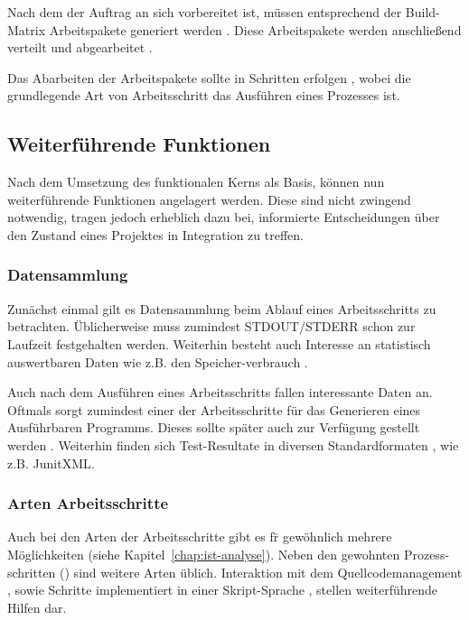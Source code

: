 Nach dem der Auftrag an sich vorbereitet ist, müssen entsprechend der Build-Matrix 
Arbeitspakete generiert werden .
Diese Arbeitspakete werden anschließend verteilt  und abgearbeitet .

Das Abarbeiten der Arbeitspakete sollte in Schritten erfolgen ,
wobei die grundlegende Art von Arbeitsschritt das Ausführen eines Prozesses  ist.


\subsection{Weiterführende Funktionen}

Nach dem Umsetzung des funktionalen Kerns als Basis,
k\"onnen nun weiterf\"uhrende Funktionen angelagert werden.
Diese sind nicht zwingend notwendig, tragen jedoch erheblich dazu bei,
informierte Entscheidungen \"uber den Zustand eines Projektes in Integration zu treffen.

\subsubsection{Datensammlung}

Zun\"achst einmal gilt es Datensammlung beim Ablauf eines Arbeitsschritts zu betrachten.
\"Ublicherweise muss zumindest STDOUT/STDERR schon zur Laufzeit festgehalten  werden.
Weiterhin besteht auch Interesse an statistisch auswertbaren Daten
wie z.B. den Speicher-verbrauch .

Auch nach dem Ausf\"uhren eines Arbeitsschritts fallen interessante Daten an.
Oftmals sorgt zumindest einer der Arbeitsschritte für das Generieren eines Ausführbaren Programms.
Dieses sollte sp\"ater auch zur Verf\"ugung gestellt werden .
Weiterhin finden sich Test-Resultate in diversen Standardformaten ,
wie z.B. JunitXML.

\subsubsection{Arten Arbeitsschritte}

Auch bei den Arten der Arbeitsschritte gibt es f\"r gew\"ohnlich mehrere M\"oglichkeiten (siehe Kapitel~\ref{chap:ist-analyse}).
Neben den gewohnten Prozess-schritten () sind weitere Arten \"ublich.
Interaktion mit dem Quellcodemanagement , sowie
Schritte implementiert in einer Skript-Sprache ,
stellen weiterf\"uhrende Hilfen dar.

